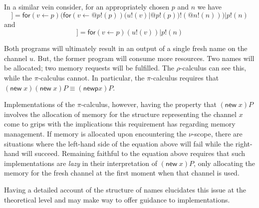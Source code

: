 \documentclass{llncs}
\makeatletter
\newcommand{\pic}{$\pi$-calculus}
\newcommand{\ldb}{[\![}
\newcommand{\rdb}{]\!]}
\newcommand{\quotep}[1]{\mathsf{@}#1}
\newcommand{\meaningof}[1]{\ldb #1 \rdb}
\newcommand{\rhoc}{$\rho$-calculus}
\makeatother
\begin{document}
\begin{example}
	In a similar vein consider, for an appropriately chosen $p$ and $n$ we have
	\begin{equation*}
		\meaningof{(\mathsf{new}\;v)(\mathsf{new}\;v) u!(v)} = \mathsf{for}(v \leftarrow p)(\mathsf{for}({v} \leftarrow {\quotep{p!(p)}})(u!(v)|\quotep{p!(p)})!(\quotep{n!(n)})) | p!(n)
	\end{equation*}
	and
	\begin{equation*}
		\meaningof{(\mathsf{new}\;v)u!(v)} = \mathsf{for}(v \leftarrow p)(u!(v) )|p!(n)
	\end{equation*}

	Both programs will ultimately result in an output of a single
	fresh name on the channel $u$. But, the former program will
	consume more resources. Two names will be allocated; two memory
	requests will be fulfilled. The {\rhoc} can see this, while the
	{\pic} cannot. In particular, the {\pic} requires that
	$(\mathsf{new}\;x)(\mathsf{new}\;x)P \equiv (\mathsf{newp} x)P$.

	Implementations of the {\pic}, however, having the property that
	$(\mathsf{new}\;x)P$ involves the allocation of memory for the
	structure representing the channel $x$ come to grips with the
	implications this requirement has regarding memory management. If
	memory is allocated upon encountering the $\nu$-scope, there are
	situations where the left-hand side of the equation above will
	fail while the right-hand will succeed. Remaining faithful to the
	equation above requires that such implementations are
	\textit{lazy} in their interpretation of $(\mathsf{new}\;x)P$, only
	allocating the memory for the fresh channel at the first moment
	when that channel is used.

	Having a detailed account of the structure of names elucidates
	this issue at the theoretical level and may make way to offer
	guidance to implementations.
\end{example}
\end{document}
